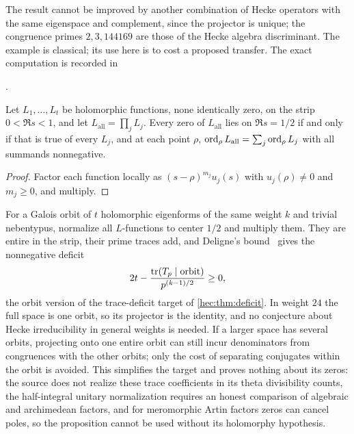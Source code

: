The result cannot be improved by another combination of Hecke operators
with the same eigenspace and complement, since the projector is unique;
the congruence primes $2,3,144169$ are those of the Hecke algebra
discriminant. The example is classical; its use here is to cost a proposed
transfer. The exact computation is recorded in
\begin{center}
.
\end{center}

\begin{proposition}\label{sel:prop:orbit}
Let $L_1,\dots,L_t$ be holomorphic functions, none identically zero, on the
strip $0<\Re s<1$, and let $L_{\mathrm{all}}=\prod_jL_j$. Every zero of
$L_{\mathrm{all}}$ lies on $\Re s=1/2$ if and only if that is true of every
$L_j$, and at each point $\rho$,
$\operatorname{ord}_\rho L_{\mathrm{all}}=\sum_j\operatorname{ord}_\rho L_j$ with all summands
nonnegative.
\end{proposition}

\begin{proof}
Factor each function locally as $(s-\rho)^{m_j}u_j(s)$ with
$u_j(\rho)\ne0$ and $m_j\ge0$, and multiply.
\end{proof}

For a Galois orbit of $t$ holomorphic eigenforms of the same weight $k$ and
trivial nebentypus, normalize all $L$-functions to center $1/2$ and
multiply them. They are entire in the strip, their prime traces add, and
Deligne's bound~\cite{Deligne1974Weil} gives the nonnegative deficit
\[
 2t-\frac{\operatorname{tr}(T_p\mid\text{orbit})}{p^{(k-1)/2}}\ge0,
\]
the orbit version of the trace-deficit target of \cref{hec:thm:deficit}. In weight
$24$ the full space is one orbit, so its projector is the identity, and no
conjecture about Hecke irreducibility in general weights is needed. If a
larger space has several orbits, projecting onto one entire orbit can still
incur denominators from congruences with the other orbits; only the cost of
separating conjugates within the orbit is avoided. This simplifies the
target and proves nothing about its zeros: the source does not realize
these trace coefficients in its theta divisibility counts, the
half-integral unitary normalization requires an honest comparison of
algebraic and archimedean factors, and for meromorphic Artin factors zeros
can cancel poles, so the proposition cannot be used without its holomorphy
hypothesis.

